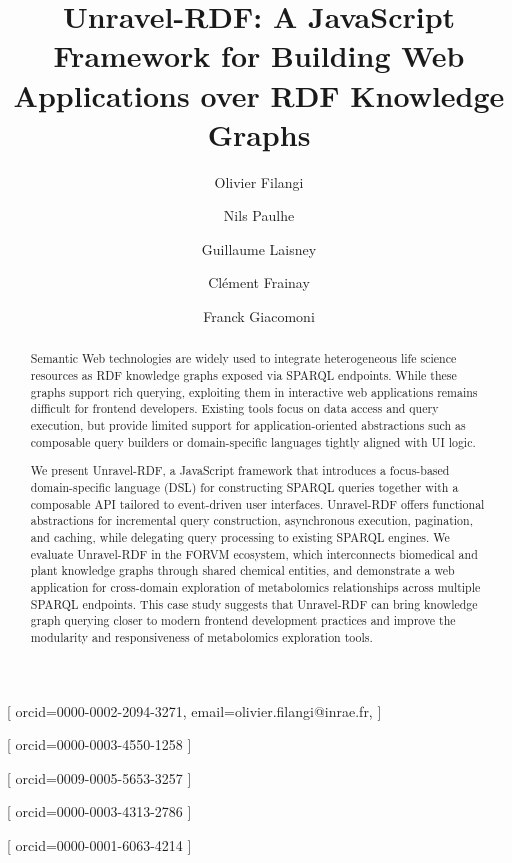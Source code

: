 \documentclass[
]{ceurart}
\begin{document}


\title{Unravel-RDF: A JavaScript Framework for Building Web Applications over RDF Knowledge Graphs}

\tnotemark[1]

\author[1]{Olivier Filangi}[%
  orcid=0000-0002-2094-3271,
  email=olivier.filangi@inrae.fr,
]

\cormark[1]
\address[1]{Institute for Genetics, Environment and Plant Protection (IGEPP), National Research Institute for Agriculture, Food and Environment (INRAE), Université Rennes, Institut Agro, Le Rheu, France}

\author[2]{Nils Paulhe}[%
  orcid=0000-0003-4550-1258
]

\address[4]{Vrije Universiteit Amsterdam, De Boelelaan 1105, 1081 HV Amsterdam, The Netherlands}

\author[3]{Guillaume Laisney}[%
  orcid=0009-0005-5653-3257
]

\address[5]{University of Skövde, Högskolevägen 1, 541 28 Skövde, Sweden}

\author[4]{Clément Frainay}[%
  orcid=0000-0003-4313-2786
]

\author[5]{Franck Giacomoni}[%
  orcid=0000-0001-6063-4214
]



\begin{abstract}
Semantic Web technologies are widely used to integrate heterogeneous
life science resources as RDF knowledge graphs exposed via SPARQL
endpoints. While these graphs support rich querying, exploiting them
in interactive web applications remains difficult for frontend
developers. Existing tools focus on data access and query execution,
but provide limited support for application-oriented abstractions
such as composable query builders or domain-specific languages
tightly aligned with UI logic.

We present Unravel-RDF, a JavaScript framework that introduces a
focus-based domain-specific language (DSL) for constructing SPARQL
queries together with a composable API tailored to event-driven user
interfaces. Unravel-RDF offers functional abstractions for incremental
query construction, asynchronous execution, pagination, and caching,
while delegating query processing to existing SPARQL engines. We
evaluate Unravel-RDF in the FORVM ecosystem, which interconnects
biomedical and plant knowledge graphs through shared chemical
entities, and demonstrate a web application for cross-domain
exploration of metabolomics relationships across multiple SPARQL
endpoints. This case study suggests that Unravel-RDF can bring
knowledge graph querying closer to modern frontend development
practices and improve the modularity and responsiveness of
metabolomics exploration tools.
\end{abstract}
\end{document}
